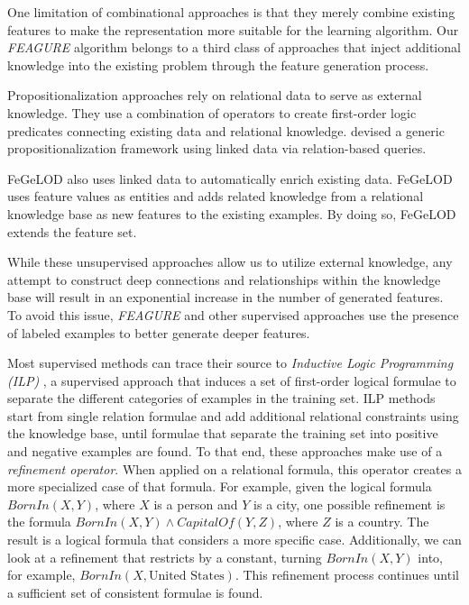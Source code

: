 \documentclass[twoside,11pt]{article}
\theoremstyle{definition}
\begin{document}
One limitation of combinational approaches is that they merely combine existing features to make the representation more suitable for the 
learning algorithm. 
Our \emph{FEAGURE} algorithm belongs to a third class of approaches that inject additional knowledge into the existing problem through the feature generation process.

Propositionalization approaches  rely on relational data to serve as external knowledge. They use a combination of operators to create first-order logic predicates connecting existing data and relational knowledge. 
 devised a generic propositionalization framework  using linked data via relation-based queries. 

FeGeLOD \cite{paulheim2012unsupervisedfull} also uses linked data to automatically enrich existing data. 
FeGeLOD uses feature values as entities and adds related knowledge from a relational knowledge base as new features to the existing examples. By doing so, FeGeLOD extends the feature set.

While these unsupervised approaches allow us to utilize external knowledge, any attempt to construct deep connections and relationships within the knowledge base will result in an exponential increase in the number of generated features.
To avoid this issue, \emph{FEAGURE} and other supervised approaches use the presence of labeled examples to better generate deeper features.

Most supervised methods can trace their source to \emph{Inductive Logic Programming (ILP)} \cite{muggleton1991inductive}, a supervised approach that induces a set of first-order logical formulae to separate the different categories of examples in the training set.
ILP methods start from single relation formulae and add additional relational constraints using the knowledge base, until formulae that separate the training set into positive and negative examples are found. To that end, these approaches make use of a \emph{refinement operator}. When applied on a relational formula, this operator creates a more specialized case of that formula. For example, given the logical formula $BornIn(X,Y)$, where $X$ is a person and $Y$ is a city, one possible refinement is the formula $BornIn(X,Y)\land CapitalOf(Y,Z)$, where $Z$ is a country. The result is a logical formula that considers a more specific case. Additionally, we can look at a refinement that restricts by a constant, turning $BornIn(X,Y)$ into, for example, $BornIn(X, \mbox{{United States}})$. This refinement process continues until a sufficient set of consistent formulae is found. 
\end{document}
